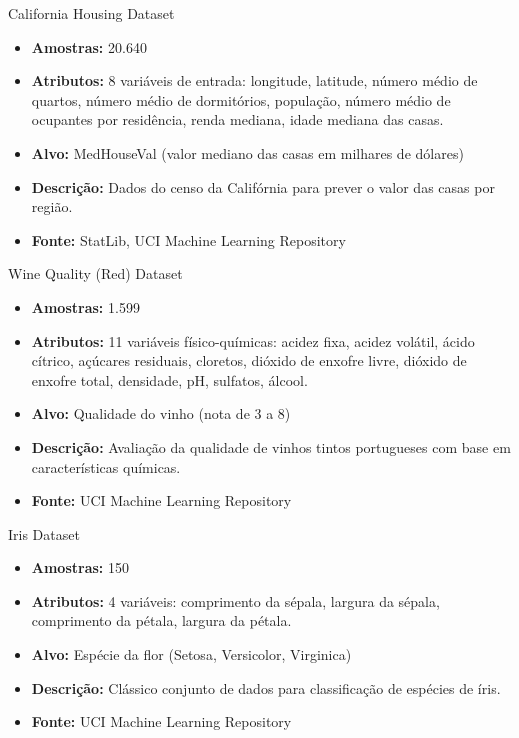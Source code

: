 \documentclass[aspectratio=169]{beamer}
\begin{document}
\begin{frame}{California Housing Dataset}
  \begin{itemize}
    \item \textbf{Amostras:} 20.640
    \item \textbf{Atributos:} 8 variáveis de entrada: longitude, latitude, número médio de quartos, número médio de dormitórios, população, número médio de ocupantes por residência, renda mediana, idade mediana das casas.
    \item \textbf{Alvo:} MedHouseVal (valor mediano das casas em milhares de dólares)
    \item \textbf{Descrição:} Dados do censo da Califórnia para prever o valor das casas por região.
    \item \textbf{Fonte:} StatLib, UCI Machine Learning Repository
  \end{itemize}
\end{frame}

\begin{frame}{Wine Quality (Red) Dataset}
  \begin{itemize}
    \item \textbf{Amostras:} 1.599
    \item \textbf{Atributos:} 11 variáveis físico-químicas: acidez fixa, acidez volátil, ácido cítrico, açúcares residuais, cloretos, dióxido de enxofre livre, dióxido de enxofre total, densidade, pH, sulfatos, álcool.
    \item \textbf{Alvo:} Qualidade do vinho (nota de 3 a 8)
    \item \textbf{Descrição:} Avaliação da qualidade de vinhos tintos portugueses com base em características químicas.
    \item \textbf{Fonte:} UCI Machine Learning Repository
  \end{itemize}
\end{frame}

\begin{frame}{Iris Dataset}
  \begin{itemize}
    \item \textbf{Amostras:} 150
    \item \textbf{Atributos:} 4 variáveis: comprimento da sépala, largura da sépala, comprimento da pétala, largura da pétala.
    \item \textbf{Alvo:} Espécie da flor (Setosa, Versicolor, Virginica)
    \item \textbf{Descrição:} Clássico conjunto de dados para classificação de espécies de íris.
    \item \textbf{Fonte:} UCI Machine Learning Repository
  \end{itemize}
\end{frame}
\end{document}
